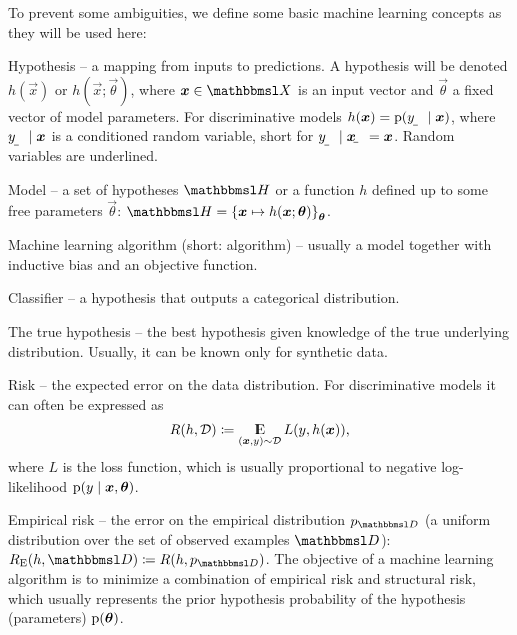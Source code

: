 \documentclass[conference,compsoc]{IEEEtran}
\begin{document}
To prevent some ambiguities, we define some basic machine learning concepts as they will be used here:
\begin{soliditemize}
	\item Hypothesis -- a mapping from inputs to predictions. A hypothesis will be denoted $h(\vec x)$ or $h(\vec x;\vec\theta)$, where $\vec x\in\set X$ is an input vector and $\vec\theta$ a fixed vector of model parameters. For discriminative models $h(\vec x)=\p(\rvar y\mid\vec x)$, where $\rvar y\mid\vec x$ is a conditioned random variable, short for $\rvar y\mid\rvec x=\vec x$. Random variables are underlined.
	\item Model -- a set of hypotheses $\set H$ or a function $h$ defined up to some free parameters $\vec\theta$: $\set H=\cbr{\vec x\mapsto h(\vec x;\vec\theta)}_{\vec\theta}$.
	\item Machine learning algorithm (short: algorithm) -- usually a model together with inductive bias and an objective function. %
	\item Classifier -- a hypothesis that outputs a categorical distribution.
	\item The true hypothesis -- the best hypothesis given knowledge of the true underlying distribution. Usually, it can be known only for synthetic data.
	\item Risk -- the expected error on the data distribution. For discriminative models it can often be expressed as
	\begin{align}
		R(h,\mathcal{D})\coloneqq\operatorname*{\mathrm{I\kern-.282em E}}_{(\boldsymbol{x},y)\sim\mathcal{D}}L(y, h(\boldsymbol{x})) \text{,}
	\end{align} where $L$ is the loss function, which is usually proportional to negative log-likelihood $\operatorname{\mathrm{p}}(y\mid\boldsymbol{x},\boldsymbol{\theta})$.
	\item Empirical risk -- the error on the empirical distribution $p_{\set D}$ (a uniform distribution over the set of observed examples $\set D$): $R_\text{E}(h,\set D)\coloneqq R(h,p_{\set D})$. The objective of a machine learning algorithm is to minimize a combination of empirical risk and structural risk, which usually represents the prior hypothesis probability of the hypothesis (parameters) $\operatorname{\mathrm{p}}(\boldsymbol{\theta})$.
\end{soliditemize}
\end{document}
